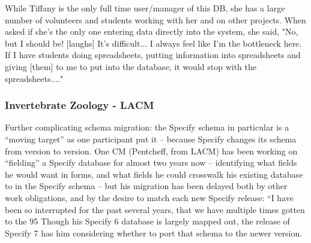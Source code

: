 While Tiffany is the only full time user/manager of this DB, she has a large number of volunteers and students working with her and on other projects.  When asked if she's the only one entering data directly into the system, she said, 
"No, but I should be!  [laughs]  It's difficult...  I always feel like I'm the bottleneck here.  If I have students doing spreadsheets, putting information into spreadsheets and giving [them] to me to put into the database, it would stop with the spreadsheets...."  

\subsubsection{Invertebrate Zoology - LACM}
Further complicating schema migration: the Specify schema in particular is a “moving target” as one participant put it – because Specify changes its schema from version to version.  One CM (Pentcheff, from LACM) has been working on “fielding” a Specify database for almost two years now – identifying what fields he would want in forms, and what fields he could crosswalk his existing database to in the Specify schema – but his migration has been delayed both by other work obligations, and by the desire to match each new Specify release:
“I have been so interrupted for the past several years, that we have multiple times gotten to the 95%
Though his Specify 6 database is largely mapped out, the release of Specify 7 has him considering whether to port that schema to the newer version. 


